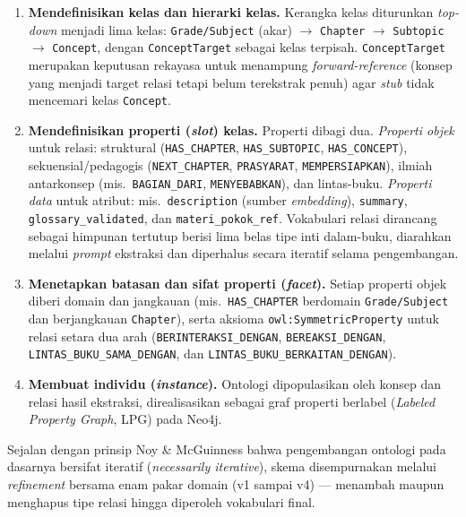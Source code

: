 \documentclass[../../thesis]{subfiles}
\begin{document}
\begin{enumerate}
  \item \textbf{Mendefinisikan kelas dan hierarki kelas.} Kerangka kelas
        diturunkan \textit{top-down} menjadi lima kelas: \texttt{Grade/Subject}
        (akar) $\rightarrow$ \texttt{Chapter} $\rightarrow$ \texttt{Subtopic}
        $\rightarrow$ \texttt{Concept}, dengan \texttt{ConceptTarget} sebagai
        kelas terpisah. \texttt{ConceptTarget} merupakan keputusan rekayasa
        untuk menampung \textit{forward-reference} (konsep yang menjadi target
        relasi tetapi belum terekstrak penuh) agar \textit{stub} tidak mencemari
        kelas \texttt{Concept}.

  \item \textbf{Mendefinisikan properti (\textit{slot}) kelas.} Properti dibagi
        dua. \emph{Properti objek} untuk relasi: struktural
        (\texttt{HAS\_CHAPTER}, \texttt{HAS\_SUBTOPIC}, \texttt{HAS\_CONCEPT}),
        sekuensial/pedagogis (\texttt{NEXT\_CHAPTER}, \texttt{PRASYARAT},
        \texttt{MEMPERSIAPKAN}), ilmiah antarkonsep (mis.\ \texttt{BAGIAN\_DARI},
        \texttt{MENYEBABKAN}), dan lintas-buku. \emph{Properti data} untuk
        atribut: mis.\ \texttt{description} (sumber \textit{embedding}),
        \texttt{summary}, \texttt{glossary\_validated}, dan
        \texttt{materi\_pokok\_ref}. Vokabulari relasi dirancang sebagai
        himpunan tertutup berisi lima belas tipe inti dalam-buku, diarahkan
        melalui \textit{prompt} ekstraksi dan diperhalus secara iteratif selama
        pengembangan.

  \item \textbf{Menetapkan batasan dan sifat properti (\textit{facet}).} Setiap properti objek
        diberi domain dan jangkauan (mis.\ \texttt{HAS\_CHAPTER} berdomain
        \texttt{Grade/Subject} dan berjangkauan \texttt{Chapter}), serta aksioma
        \texttt{owl:SymmetricProperty} untuk relasi setara dua arah
        (\texttt{BERINTERAKSI\_DENGAN}, \texttt{BEREAKSI\_DENGAN},
        \texttt{LINTAS\_BUKU\_SAMA\_DENGAN}, dan
        \texttt{LINTAS\_BUKU\_BERKAITAN\_DENGAN}).

  \item \textbf{Membuat individu (\textit{instance}).} Ontologi dipopulasikan oleh konsep dan relasi
        hasil ekstraksi, direalisasikan sebagai graf properti berlabel
        (\textit{Labeled Property Graph}, LPG) pada Neo4j.
\end{enumerate}

Sejalan dengan prinsip Noy \& McGuinness bahwa pengembangan ontologi pada
dasarnya bersifat iteratif (\textit{necessarily iterative}), skema disempurnakan
melalui \textit{refinement} bersama enam pakar domain (v1 sampai v4) ---
menambah maupun menghapus tipe relasi hingga diperoleh vokabulari final.
\end{document}
